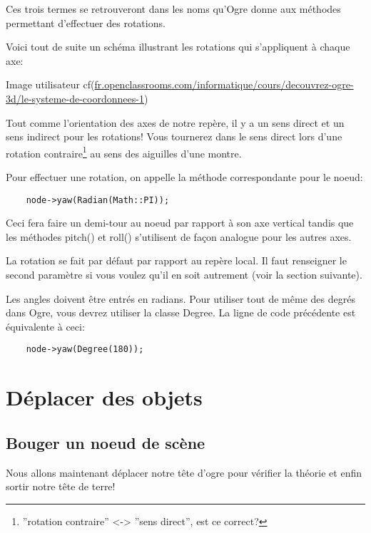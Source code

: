 \documentclass[10pt,a4paper]{report}
\begin{document}
Ces trois termes se retrouveront dans les noms qu'Ogre donne aux m\'ethodes permettant d'effectuer des rotations. 

Voici tout de suite un sch\'ema illustrant les rotations qui s'appliquent \`{a} chaque axe:

Image utilisateur cf(\url{fr.openclassrooms.com/informatique/cours/decouvrez-ogre-3d/le-systeme-de-coordonnees-1})


Tout comme l'orientation des axes de notre rep\`ere, il y a un sens direct et un sens indirect pour les rotations! Vous tournerez dans le sens direct lors  d'une rotation contraire\footnote{''rotation contraire'' <-> ''sens direct'', est ce correct?} au sens des aiguilles d'une montre.

Pour effectuer une rotation, on appelle la m\'ethode correspondante pour le noeud:
\begin{lstlisting}
	node->yaw(Radian(Math::PI));
\end{lstlisting}

Ceci fera faire un demi-tour au noeud par rapport \`{a} son axe vertical tandis que les m\'ethodes pitch() et roll() s'utilisent de fa\c{c}on analogue pour les autres axes.

La rotation se fait par d\'efaut par rapport au rep\`ere local. Il faut renseigner le second param\`etre si vous voulez qu'il en soit autrement (voir la section suivante).

Les angles doivent \^etre entr\'es en radians. Pour utiliser tout de m\^eme des degr\'es dans Ogre, vous devrez utiliser la classe Degree. La ligne de code pr\'ec\'edente est \'equivalente \`{a} ceci:
\begin{lstlisting}
	node->yaw(Degree(180));
\end{lstlisting}









\section{D\'eplacer des objets}




\subsection{Bouger un noeud de sc\`ene}

Nous allons maintenant d\'eplacer notre t\^ete d'ogre pour v\'erifier la th\'eorie et enfin sortir notre t\^ete de terre!
\end{document}
